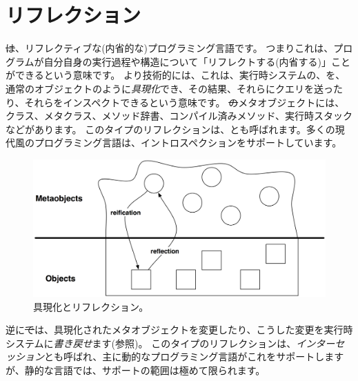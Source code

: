 \documentclass[a4paper,10pt,twoside]{book}
\begin{document}
	\renewcommand{\nnbb}[2]{} %
	\sloppy
\fi

\chapter{リフレクション}


\st は、リフレクティブな(内省的な)プログラミング言語です。
つまりこれは、プログラムが自分自身の実行過程や構造について「リフレクトする(内省する)」ことができるという意味です。
より技術的には、これは、実行時システムの、を、通常のオブジェクトのように\emph{具現化}でき、その結果、それらにクエリを送ったり、それらをインスペクトできるという意味です。
\st のメタオブジェクトには、クラス、メタクラス、メソッド辞書、コンパイル済みメソッド、実行時スタックなどがあります。
このタイプのリフレクションは、とも呼ばれます。多くの現代風のプログラミング言語は、イントロスペクションをサポートしています。

\begin{figure}[ht]\centering
	\includegraphics[width=\linewidth]{reflect}
	\caption{具現化とリフレクション。} %
\end{figure}

逆に\st では、具現化されたメタオブジェクトを変更したり、こうした変更を実行時システムに\emph{書き戻せ}ます(参照)。
このタイプのリフレクションは、\emph{インターセッション}とも呼ばれ、主に動的なプログラミング言語がこれをサポートしますが、静的な言語では、サポートの範囲は極めて限られます。
\end{document}
